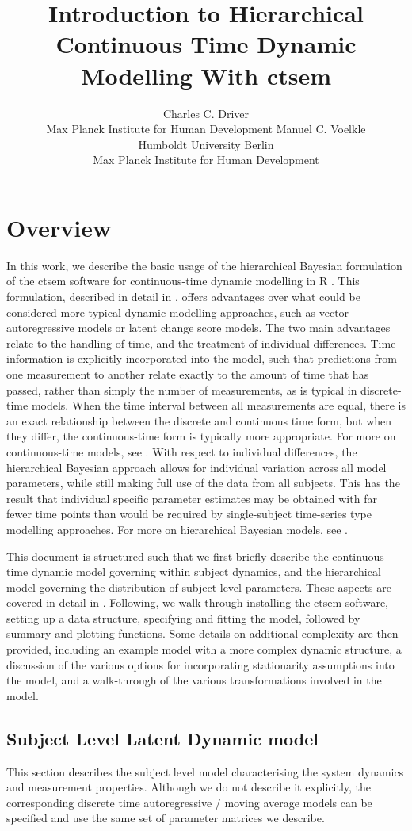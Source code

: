 \documentclass[11pt]{article}\usepackage[]{graphicx}\usepackage[]{color}
\author{Charles C. Driver \\ Max Planck Institute for Human Development \And 
Manuel C. Voelkle \\ Humboldt University Berlin \\ Max Planck Institute for Human Development}
\title{Introduction to Hierarchical Continuous Time Dynamic Modelling With ctsem}
\begin{document}
\section{Overview}
In this work, we describe the basic usage of the hierarchical Bayesian formulation of the ctsem \citep{driver2017continuous} software for continuous-time dynamic modelling in R \citep{rcoreteam2014r}. This formulation, described in detail in \citet{driver2016hierarchical}, offers advantages over what could be considered more typical dynamic modelling approaches, such as vector autoregressive models or latent change score models. The two main advantages relate to the handling of time, and the treatment of individual differences. Time information is explicitly incorporated into the model, such that predictions from one measurement to another relate exactly to the amount of time that has passed, rather than simply the number of measurements, as is typical in discrete-time models. When the time interval between all measurements are equal, there is an exact relationship between the discrete and continuous time form, but when they differ, the continuous-time form is typically more appropriate. For more on continuous-time models, see \citet{singer1993continuoustime, oud2000continuous, voelkle2013continuous}. With respect to individual differences, the hierarchical Bayesian approach allows for individual variation across all model parameters, while still making full use of the data from all subjects. This has the result that individual specific parameter estimates may be obtained with far fewer time points than would be required by single-subject time-series type modelling approaches. For more on hierarchical Bayesian models, see \citet{gelman2014bayesian}.

This document is structured such that we first briefly describe the continuous time dynamic model governing within subject dynamics, and the hierarchical model governing the distribution of subject level parameters. These aspects are covered in detail in \citet{driver2016hierarchical}. Following, we walk through installing the ctsem software, setting up a data structure, specifying and fitting the model, followed by summary and plotting functions. Some details on additional complexity are then provided, including an example model with a more complex dynamic structure, a discussion of the various options for incorporating stationarity assumptions into the model, and a walk-through of the various transformations involved in the model. 

\subsection{Subject Level Latent Dynamic model}
This section describes the subject level model characterising the system dynamics and measurement properties.  Although we do not describe it explicitly, the corresponding discrete time autoregressive / moving average models can be specified and use the same set of parameter matrices we describe.
\end{document}
